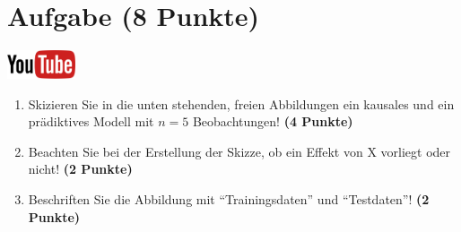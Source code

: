 \documentclass[a4paper, 10pt]{scrartcl}\usepackage[]{graphicx}\usepackage[]{xcolor}
\begin{document}
\clearpage

\section{Aufgabe \hfill (8 Punkte)}

\hfill\href{https://youtu.be/C_a8aOMI7GE}{\includegraphics[width =
  2cm]{img/youtube}}\\[1Ex]



\begin{enumerate}
\item Skizieren Sie in die unten stehenden, freien Abbildungen ein kausales
  und ein pr{\"a}diktives Modell mit $n = 5$
  Beobachtungen! \textbf{(4 Punkte)}
\item Beachten Sie bei der Erstellung der Skizze, ob ein Effekt von X
  vorliegt oder nicht! \textbf{(2 Punkte)}
\item Beschriften Sie die Abbildung mit "`Trainingsdaten"' und "`Testdaten"'!  \textbf{(2 Punkte)}
\end{enumerate}
\end{document}
